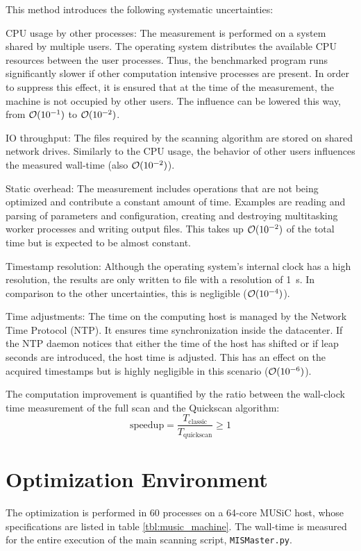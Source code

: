 This method introduces the following systematic uncertainties:
\begin{my_list}
	\item CPU usage by other processes: The measurement is performed on a system shared by multiple users. The operating system distributes the available CPU resources between the user processes. Thus, the benchmarked program runs significantly slower if other computation intensive processes are present. In order to suppress this effect, it is ensured that at the time of the measurement, the machine is not occupied by other users. The influence can be lowered this way, from $\order{\num{e-1}}$ to $\order{\num{e-2}}$.
	\item IO throughput: The files required by the scanning algorithm are stored on shared network drives. Similarly to the CPU usage, the behavior of other users influences the measured wall-time (also $\order{\num{e-2}}$).
	\item Static overhead: The measurement includes operations that are not being optimized and contribute a constant amount of time. Examples are reading and parsing of parameters and configuration, creating and destroying multitasking worker processes and writing output files. This takes up $\order{\num{e-2}}$ of the total time but is expected to be almost constant.
	\item Timestamp resolution: Although the operating system's internal clock has a high resolution, the results are only written to file with a resolution of \SI{1}{\second}. In comparison to the other uncertainties, this is negligible ($\order{\num{e-4}}$). 
	\item Time adjustments: The time on the computing host is managed by the Network Time Protocol (NTP). It ensures time synchronization inside the datacenter. If the NTP daemon notices that either the time of the host has shifted or if leap seconds are introduced, the host time is adjusted. This has an effect on the acquired timestamps but is highly negligible in this scenario ($\order{\num{e-6}}$).
\end{my_list}

The computation improvement is quantified by the ratio between the wall-clock time measurement of the full scan and the Quickscan algorithm:
\begin{equation}
	\textrm{speedup} = \frac{T_{\textrm{classic}}}{T_{\textrm{quickscan}}} \geq 1 
\end{equation}


\section{Optimization Environment}
The optimization is performed in \num{60} processes on a 64-core MUSiC host, whose specifications are listed in table \ref{tbl:music_machine}. The wall-time is measured for the entire execution of the main scanning script, \texttt{MISMaster.py}.

